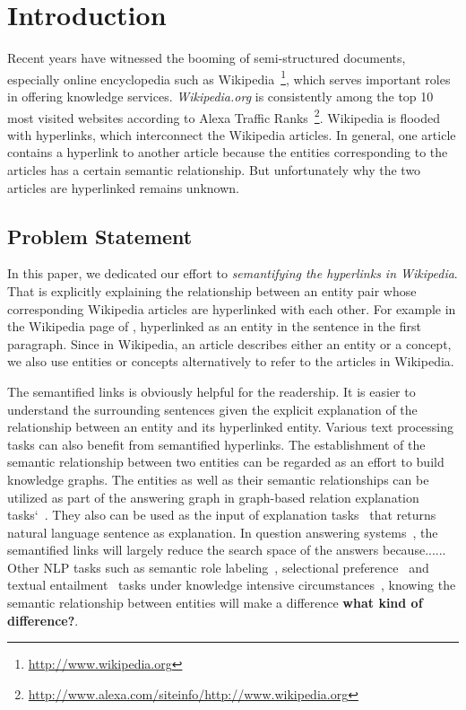 \section{Introduction}
Recent years have witnessed the booming of semi-structured documents, especially online encyclopedia such as  Wikipedia~\footnote{\small\url{http://www.wikipedia.org}}, which serves important roles in offering knowledge services.
{\it Wikipedia.org} is consistently among the top 10 most visited websites according to Alexa Traffic Ranks~\footnote{\small\url{http://www.alexa.com/siteinfo/http://www.wikipedia.org}}.
Wikipedia is flooded with hyperlinks, which interconnect the Wikipedia articles.
In general, one article contains a hyperlink to another article because the entities corresponding to the articles has a certain semantic relationship.
But unfortunately why the two articles are hyperlinked remains unknown.

\subsection{Problem Statement}
In this paper, we dedicated our effort to {\it semantifying the hyperlinks in Wikipedia}.
That is explicitly explaining the relationship between an entity pair whose corresponding Wikipedia articles are hyperlinked with each other. For example in the Wikipedia page of ,  hyperlinked as an entity in the sentence  in the first paragraph.
Since in Wikipedia, an article describes either an entity or a concept, we also use entities or concepts alternatively to refer to the articles in Wikipedia. 

The semantified links is obviously helpful for the readership. It is easier to understand the surrounding sentences given the explicit explanation of the relationship between an entity and its hyperlinked entity.
Various text processing tasks can also benefit from semantified hyperlinks.
The establishment of the semantic relationship between two entities can be regarded as an effort to build knowledge graphs.
The entities as well as their semantic relationships can be utilized as part of the answering graph in graph-based relation explanation tasks`~\cite{fang2011rex}. They also can be used as the input of explanation tasks~\cite{voskarideslearning} that returns natural language sentence as explanation.
In question answering systems~\cite{yang2014slq}, the semantified links will largely reduce the search space of the answers because...... Other NLP tasks such as semantic role labeling~\cite{palmer2010semantic}, selectional preference~\cite{pantel2007isp} and textual entailment~\cite{androutsopoulos2010survey} tasks under knowledge intensive circumstances~\cite{yao2012unsupervised,exner2011using}, knowing the semantic relationship between entities will make a difference {\bf what kind of difference?}.


